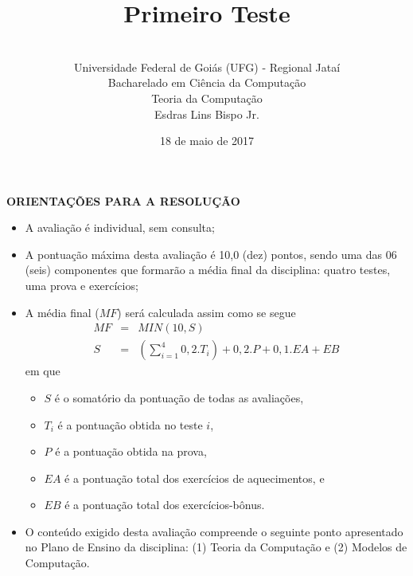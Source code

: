\documentclass[12pt,a4paper,oneside]{article}
\author{\\Universidade Federal de Goiás (UFG) - Regional  Jataí\\Bacharelado em Ciência da Computação \\Teoria da Computação \\Esdras Lins Bispo Jr.}
\date{18 de maio de 2017}
\title{\sc \huge Primeiro Teste}
\begin{document}
\maketitle

{\bf ORIENTAÇÕES PARA A RESOLUÇÃO}

\small
 
\begin{itemize}
	\item A avaliação é individual, sem consulta;
	\item A pontuação máxima desta avaliação é 10,0 (dez) pontos, sendo uma das 06 (seis) componentes que formarão a média final da disciplina: quatro testes, uma prova e exercícios;
	\item A média final ($MF$) será calculada assim como se segue
	\begin{eqnarray}
		MF & = & MIN(10, S) \nonumber \\
		S & = & (\sum_{i=1}^{4} 0,2.T_i ) + 0,2.P  + 0,1.EA + EB\nonumber
	\end{eqnarray}
	em que 
	\begin{itemize}
		\item $S$ é o somatório da pontuação de todas as avaliações,
		\item $T_i$ é a pontuação obtida no teste $i$,
		\item $P$ é a pontuação obtida na prova,
		\item $EA$ é a pontuação total dos exercícios de aquecimentos, e
		\item $EB$ é a pontuação total dos exercícios-bônus.
	\end{itemize}
	\item O conteúdo exigido desta avaliação compreende o seguinte ponto apresentado no Plano de Ensino da disciplina: (1) Teoria da Computação e (2) Modelos de Computação.
\end{itemize}

\begin{center}
\end{center}

\newpage
\end{document}
